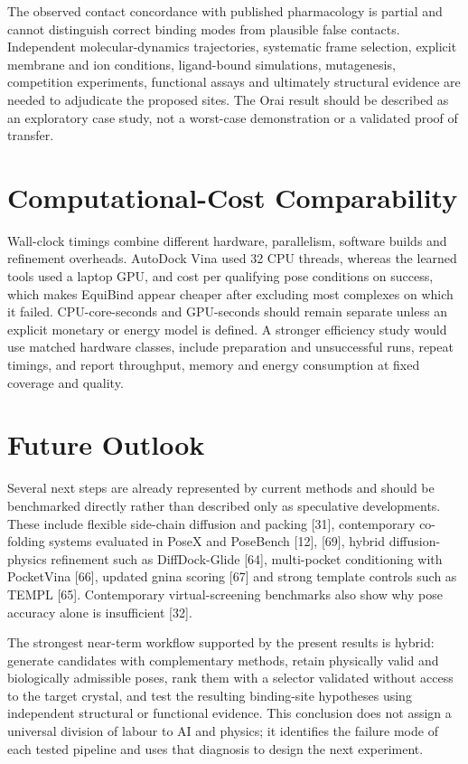 The observed contact concordance with published pharmacology is partial and cannot distinguish correct binding modes from plausible false contacts. Independent molecular-dynamics trajectories, systematic frame selection, explicit membrane and ion conditions, ligand-bound simulations, mutagenesis, competition experiments, functional assays and ultimately structural evidence are needed to adjudicate the proposed sites. The Orai result should be described as an exploratory case study, not a worst-case demonstration or a validated proof of transfer.

\hypertarget{computational-cost-comparability}{%
\section{Computational-Cost Comparability}\label{computational-cost-comparability}}

Wall-clock timings combine different hardware, parallelism, software builds and refinement overheads. AutoDock Vina used 32 CPU threads, whereas the learned tools used a laptop GPU, and cost per qualifying pose conditions on success, which makes EquiBind appear cheaper after excluding most complexes on which it failed. CPU-core-seconds and GPU-seconds should remain separate unless an explicit monetary or energy model is defined. A stronger efficiency study would use matched hardware classes, include preparation and unsuccessful runs, repeat timings, and report throughput, memory and energy consumption at fixed coverage and quality.

\hypertarget{future-outlook}{%
\section{Future Outlook}\label{future-outlook}}

Several next steps are already represented by current methods and should be benchmarked directly rather than described only as speculative developments. These include flexible side-chain diffusion and packing {[}31{]}, contemporary co-folding systems evaluated in PoseX and PoseBench {[}12{]}, {[}69{]}, hybrid diffusion-physics refinement such as DiffDock-Glide {[}64{]}, multi-pocket conditioning with PocketVina {[}66{]}, updated gnina scoring {[}67{]} and strong template controls such as TEMPL {[}65{]}. Contemporary virtual-screening benchmarks also show why pose accuracy alone is insufficient {[}32{]}.

The strongest near-term workflow supported by the present results is hybrid: generate candidates with complementary methods, retain physically valid and biologically admissible poses, rank them with a selector validated without access to the target crystal, and test the resulting binding-site hypotheses using independent structural or functional evidence. This conclusion does not assign a universal division of labour to AI and physics; it identifies the failure mode of each tested pipeline and uses that diagnosis to design the next experiment.

